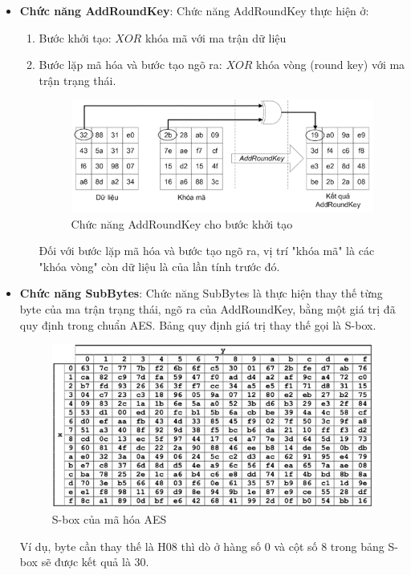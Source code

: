 \begin{itemize}
    \item \textbf{Chức năng AddRoundKey}: Chức năng AddRoundKey thực hiện ở:
    \begin{enumerate}
        \item Bước khởi tạo: $XOR$ khóa mã với ma trận dữ liệu
        \item Bước lặp mã hóa và bước tạo ngõ ra: $XOR$ khóa vòng (round key) với ma trận trạng thái. 
        \begin{figure}[H]
            \centering
            \includegraphics{Ảnh/hiền/addround.png}
            \caption{Chức năng AddRoundKey cho bước khởi tạo}
        \end{figure}
        Đối với bước lặp mã hóa và bước tạo ngõ ra, vị trí "khóa mã" là các "khóa vòng" còn dữ liệu là của lần tính trước đó.
    \end{enumerate}
    \item \textbf{Chức năng SubBytes}: Chức năng SubBytes là thực hiện thay thế từng byte của ma trận trạng thái, ngõ ra của AddRoundKey, bằng một giá trị đã quy định trong chuẩn AES. Bảng quy định giá trị thay thế gọi là S-box.
    \begin{figure}[H]
        \centering
        \includegraphics{Ảnh/hiền/s-box aes.png}
        \caption{S-box của mã hóa AES}
    \end{figure}
    Ví dụ, byte cần thay thế là H08 thì dò ở hàng số 0 và cột số 8 trong bảng S-box sẽ được kết quả là 30.

\end{itemize}
